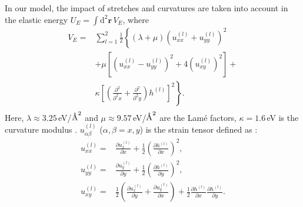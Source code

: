 \documentclass[aps,prx,10pt,twocolumn,superscriptaddress]{revtex4}
\def\angstrom{\mbox{\normalfont\AA}}
\def\angstrom{\mbox{\normalfont\AA}}
\begin{document}
In our model, the impact of stretches and curvatures are taken into account in the elastic energy $U_{E}\!=\!\int \mathrm{d}^{2}\textbf{r}\,V_{E}$, where
\begin{equation}
\begin{split}
V_{E}=&\sum^{2}_{l=1} \frac{1}{2} \left\{ \left( \lambda+\mu \right)\left( u^{(l)}_{xx}+u^{(l)}_{yy} \right)^{2}\right.\\
&\left. + \mu\left[ \left( u^{(l)}_{xx}-u^{(l)}_{yy} \right)^{2} + 4(u^{(l)}_{xy})^{2} \right] +\right.\\
&\left.\kappa\left[ (\frac{\partial^{2}}{\partial^{2}x}+\frac{\partial^{2}}{\partial^{2}y}) h^{(l)} \right]^{2} \right\}.\\
\end{split}
\end{equation}
Here, $\lambda\approx 3.25\,$eV/$\angstrom^{2}$ and $\mu\approx 9.57\,$eV/$\angstrom^{2}$ are the Lam\'e factors, $\kappa\!=\!1.6\,$eV is the curvature modulus \cite{jung2015origin}. $u^{(l)}_{\alpha\beta}$ ($\alpha,\beta=x,y$) is the strain tensor defined as \cite{landau1986theory}:
\begin{equation}
\begin{split}
u^{(l)}_{xx}=&\frac{\partial u^{(l)}_{x}}{\partial x}+\frac{1}{2}\left(\frac{\partial h^{(l)}}{\partial x}\right)^{2}, \\
u^{(l)}_{yy}=&\frac{\partial u^{(l)}_{y}}{\partial y}+\frac{1}{2}\left(\frac{\partial h^{(l)}}{\partial y}\right)^{2}, \\
u^{(l)}_{xy}=&\frac{1}{2}\left(\frac{\partial u^{(l)}_{x}}{\partial y} + \frac{\partial u^{(l)}_{y}}{\partial x} \right)+\frac{1}{2}\frac{\partial h^{(l)}}{\partial x}\frac{\partial h^{(l)}}{\partial y}.
\label{eq:strain}
\end{split}
\end{equation}
\end{document}
